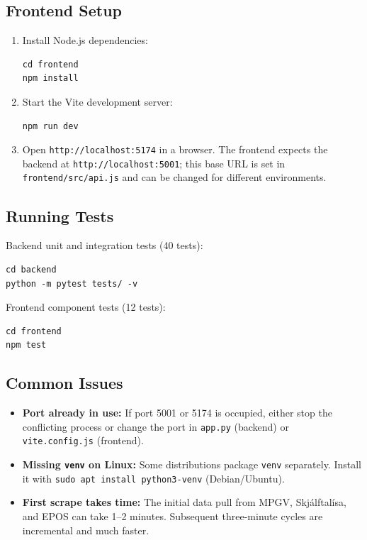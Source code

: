 \documentclass[12pt]{article}
\begin{document}
\subsection*{Frontend Setup}

\begin{enumerate}
    \item Install Node.js dependencies:
\begin{verbatim}
cd frontend
npm install
\end{verbatim}

    \item Start the Vite development server:
\begin{verbatim}
npm run dev
\end{verbatim}

    \item Open \texttt{http://localhost:5174} in a browser. The frontend expects the backend at \texttt{http://localhost:5001}; this base URL is set in \texttt{frontend/src/api.js} and can be changed for different environments.
\end{enumerate}

\subsection*{Running Tests}

Backend unit and integration tests (40 tests):
\begin{verbatim}
cd backend
python -m pytest tests/ -v
\end{verbatim}

Frontend component tests (12 tests):
\begin{verbatim}
cd frontend
npm test
\end{verbatim}

\subsection*{Common Issues}

\begin{itemize}
    \item \textbf{Port already in use:} If port 5001 or 5174 is occupied, either stop the conflicting process or change the port in \texttt{app.py} (backend) or \texttt{vite.config.js} (frontend).
    \item \textbf{Missing \texttt{venv} on Linux:} Some distributions package \texttt{venv} separately. Install it with \texttt{sudo apt install python3-venv} (Debian/Ubuntu).
    \item \textbf{First scrape takes time:} The initial data pull from MPGV, Skjálftalísa, and EPOS can take 1--2 minutes. Subsequent three-minute cycles are incremental and much faster.
\end{itemize}
\end{document}
